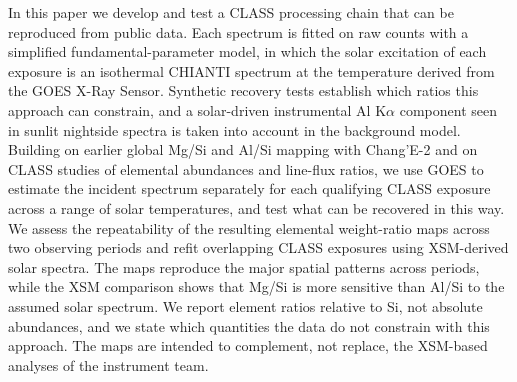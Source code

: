 In this paper we develop and test a CLASS processing chain that can be reproduced from public data. Each spectrum is fitted on raw counts with a simplified fundamental-parameter model, in which the solar excitation of each exposure is an isothermal CHIANTI spectrum at the temperature derived from the GOES X-Ray Sensor. Synthetic recovery tests establish which ratios this approach can constrain, and a solar-driven instrumental Al K$\alpha$ component seen in sunlit nightside spectra is taken into account in the background model.
Building on earlier global Mg/Si and Al/Si mapping with Chang'E-2 and on CLASS studies of elemental abundances and line-flux ratios, we use GOES to estimate the incident spectrum separately for each qualifying CLASS exposure across a range of solar temperatures, and test what can be recovered in this way. We assess the repeatability of the resulting elemental weight-ratio maps across two observing periods and refit overlapping CLASS exposures using XSM-derived solar spectra. The maps reproduce the major spatial patterns across periods, while the XSM comparison shows that Mg/Si is more sensitive than Al/Si to the assumed solar spectrum. We report element ratios relative to Si, not absolute abundances, and we state which quantities the data do not constrain with this approach. The maps are intended to complement, not replace, the XSM-based analyses of the instrument team.

